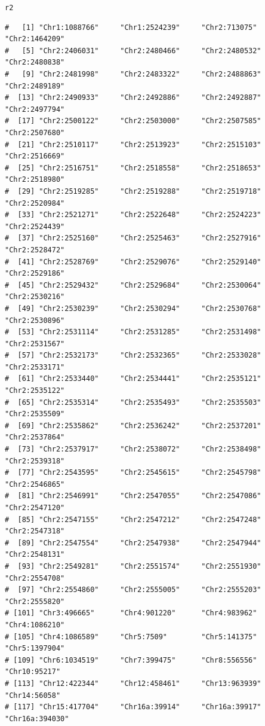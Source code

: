 \documentclass{article}\usepackage[]{graphicx}\usepackage[]{color}
\makeatletter
\newcommand{\hlstd}[1]{\textcolor[rgb]{0.345,0.345,0.345}{#1}}%
\newenvironment{kframe}{%
 \def\at@end@of@kframe{}%
 \ifinner\ifhmode%
  \def\at@end@of@kframe{\end{minipage}}%
  \begin{minipage}{\columnwidth}%
 \fi\fi%
 \def\FrameCommand##1{\hskip\@totalleftmargin \hskip-\fboxsep
 \colorbox{shadecolor}{##1}\hskip-\fboxsep
     \hskip-\linewidth \hskip-\@totalleftmargin \hskip\columnwidth}%
 \MakeFramed {\advance\hsize-\width
   \@totalleftmargin\z@ \linewidth\hsize
   \@setminipage}}%
 {\par\unskip\endMakeFramed%
 \at@end@of@kframe}
\newenvironment{knitrout}{}{} %
\makeatother
\begin{document}
\begin{knitrout}
\begin{kframe}
\begin{alltt}
\hlstd{r2}
\end{alltt}
\begin{verbatim}
#   [1] "Chr1:1088766"     "Chr1:2524239"     "Chr2:713075"      "Chr2:1464209"    
#   [5] "Chr2:2406031"     "Chr2:2480466"     "Chr2:2480532"     "Chr2:2480838"    
#   [9] "Chr2:2481998"     "Chr2:2483322"     "Chr2:2488863"     "Chr2:2489189"    
#  [13] "Chr2:2490933"     "Chr2:2492886"     "Chr2:2492887"     "Chr2:2497794"    
#  [17] "Chr2:2500122"     "Chr2:2503000"     "Chr2:2507585"     "Chr2:2507680"    
#  [21] "Chr2:2510117"     "Chr2:2513923"     "Chr2:2515103"     "Chr2:2516669"    
#  [25] "Chr2:2516751"     "Chr2:2518558"     "Chr2:2518653"     "Chr2:2518980"    
#  [29] "Chr2:2519285"     "Chr2:2519288"     "Chr2:2519718"     "Chr2:2520984"    
#  [33] "Chr2:2521271"     "Chr2:2522648"     "Chr2:2524223"     "Chr2:2524439"    
#  [37] "Chr2:2525160"     "Chr2:2525463"     "Chr2:2527916"     "Chr2:2528472"    
#  [41] "Chr2:2528769"     "Chr2:2529076"     "Chr2:2529140"     "Chr2:2529186"    
#  [45] "Chr2:2529432"     "Chr2:2529684"     "Chr2:2530064"     "Chr2:2530216"    
#  [49] "Chr2:2530239"     "Chr2:2530294"     "Chr2:2530768"     "Chr2:2530896"    
#  [53] "Chr2:2531114"     "Chr2:2531285"     "Chr2:2531498"     "Chr2:2531567"    
#  [57] "Chr2:2532173"     "Chr2:2532365"     "Chr2:2533028"     "Chr2:2533171"    
#  [61] "Chr2:2533440"     "Chr2:2534441"     "Chr2:2535121"     "Chr2:2535122"    
#  [65] "Chr2:2535314"     "Chr2:2535493"     "Chr2:2535503"     "Chr2:2535509"    
#  [69] "Chr2:2535862"     "Chr2:2536242"     "Chr2:2537201"     "Chr2:2537864"    
#  [73] "Chr2:2537917"     "Chr2:2538072"     "Chr2:2538498"     "Chr2:2539318"    
#  [77] "Chr2:2543595"     "Chr2:2545615"     "Chr2:2545798"     "Chr2:2546865"    
#  [81] "Chr2:2546991"     "Chr2:2547055"     "Chr2:2547086"     "Chr2:2547120"    
#  [85] "Chr2:2547155"     "Chr2:2547212"     "Chr2:2547248"     "Chr2:2547318"    
#  [89] "Chr2:2547554"     "Chr2:2547938"     "Chr2:2547944"     "Chr2:2548131"    
#  [93] "Chr2:2549281"     "Chr2:2551574"     "Chr2:2551930"     "Chr2:2554708"    
#  [97] "Chr2:2554860"     "Chr2:2555005"     "Chr2:2555203"     "Chr2:2555820"    
# [101] "Chr3:496665"      "Chr4:901220"      "Chr4:983962"      "Chr4:1086210"    
# [105] "Chr4:1086589"     "Chr5:7509"        "Chr5:141375"      "Chr5:1397904"    
# [109] "Chr6:1034519"     "Chr7:399475"      "Chr8:556556"      "Chr10:95217"     
# [113] "Chr12:422344"     "Chr12:458461"     "Chr13:963939"     "Chr14:56058"     
# [117] "Chr15:417704"     "Chr16a:39914"     "Chr16a:39917"     "Chr16a:394030"   

\end{verbatim}
\end{kframe}
\end{knitrout}
\end{document}
